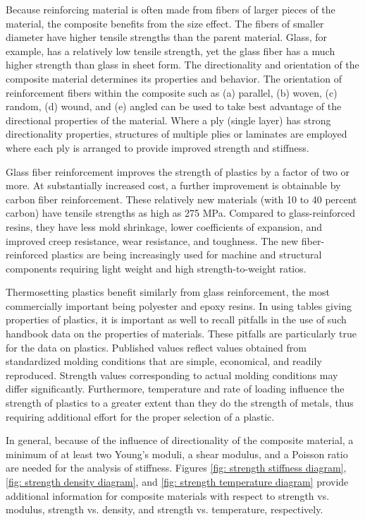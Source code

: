 \documentclass[
10pt,
a4paper,
openany,
svgnames,
]{book}
\begin{document}
Because reinforcing material is often made from fibers of larger pieces of the material, the composite benefits from the size effect. The fibers of smaller diameter have higher tensile strengths than the parent material. Glass, for example, has a relatively low tensile strength, yet the glass fiber has a much higher strength than glass in sheet form. The directionality and orientation of the composite material determines its properties and behavior. The orientation of reinforcement fibers within the composite such as (a) parallel, (b) woven, (c) random, (d) wound, and (e) angled can be used to take best advantage of the directional properties of the material. Where a ply (single layer) has strong directionality properties, structures of multiple plies or laminates are employed where each ply is arranged to provide improved strength and stiffness.

Glass fiber reinforcement improves the strength of plastics by a factor of two or more. At substantially increased cost, a further improvement is obtainable by carbon fiber reinforcement. These relatively new materials (with 10 to 40 percent carbon) have tensile strengths as high as 275 MPa. Compared to glass-reinforced resins, they have less mold shrinkage, lower coefficients of expansion, and improved creep resistance, wear resistance, and toughness. The new fiber-reinforced plastics are being increasingly used for machine and structural components requiring light weight and high strength-to-weight ratios.

Thermosetting plastics benefit similarly from glass reinforcement, the most commercially important being polyester and epoxy resins. In using tables giving properties of plastics, it is important as well to recall pitfalls in the use of such handbook data on the properties of materials. These pitfalls are particularly true for the data on plastics. Published values reflect values obtained from standardized molding conditions that are simple, economical, and readily reproduced. Strength values corresponding to actual molding conditions may differ significantly. Furthermore, temperature and rate of loading influence the strength of plastics to a greater extent than they do the strength of metals, thus requiring additional effort for the proper selection of a plastic.

In general, because of the influence of directionality of the composite material, a minimum of at least two Young’s moduli, a shear modulus, and a Poisson ratio are needed for the analysis of stiffness. Figures \ref{fig: strength stiffness diagram}, \ref{fig: strength density diagram}, and \ref{fig: strength temperature diagram} provide additional information for composite materials with respect to strength vs. modulus, strength vs. density, and strength vs. temperature, respectively. 
\end{document}
